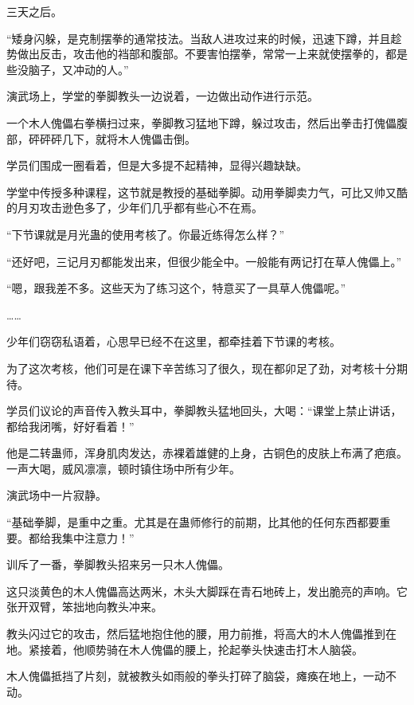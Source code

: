 
\begin{this_body}



三天之后。

“矮身闪躲，是克制摆拳的通常技法。当敌人进攻过来的时候，迅速下蹲，并且趁势做出反击，攻击他的裆部和腹部。不要害怕摆拳，常常一上来就使摆拳的，都是些没脑子，又冲动的人。”

演武场上，学堂的拳脚教头一边说着，一边做出动作进行示范。

一个木人傀儡右拳横扫过来，拳脚教习猛地下蹲，躲过攻击，然后出拳击打傀儡腹部，砰砰砰几下，就将木人傀儡击倒。

学员们围成一圈看着，但是大多提不起精神，显得兴趣缺缺。

学堂中传授多种课程，这节就是教授的基础拳脚。动用拳脚卖力气，可比又帅又酷的月刃攻击逊色多了，少年们几乎都有些心不在焉。

“下节课就是月光蛊的使用考核了。你最近练得怎么样？”

“还好吧，三记月刃都能发出来，但很少能全中。一般能有两记打在草人傀儡上。”

“嗯，跟我差不多。这些天为了练习这个，特意买了一具草人傀儡呢。”

……

少年们窃窃私语着，心思早已经不在这里，都牵挂着下节课的考核。

为了这次考核，他们可是在课下辛苦练习了很久，现在都卯足了劲，对考核十分期待。

学员们议论的声音传入教头耳中，拳脚教头猛地回头，大喝：“课堂上禁止讲话，都给我闭嘴，好好看着！”

他是二转蛊师，浑身肌肉发达，赤裸着雄健的上身，古铜色的皮肤上布满了疤痕。一声大喝，威风凛凛，顿时镇住场中所有少年。

演武场中一片寂静。

“基础拳脚，是重中之重。尤其是在蛊师修行的前期，比其他的任何东西都要重要。都给我集中注意力！”

训斥了一番，拳脚教头招来另一只木人傀儡。

这只淡黄色的木人傀儡高达两米，木头大脚踩在青石地砖上，发出脆亮的声响。它张开双臂，笨拙地向教头冲来。

教头闪过它的攻击，然后猛地抱住他的腰，用力前推，将高大的木人傀儡推到在地。紧接着，他顺势骑在木人傀儡的腰上，抡起拳头快速击打木人脑袋。

木人傀儡抵挡了片刻，就被教头如雨般的拳头打碎了脑袋，瘫痪在地上，一动不动。


\end{this_body}
